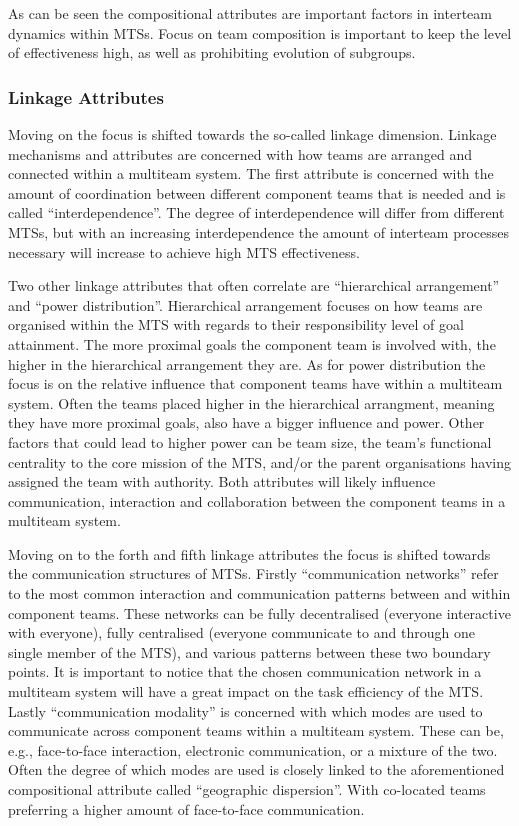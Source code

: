 As can be seen the compositional attributes are important factors in interteam dynamics within MTSs. Focus on team composition is important to keep the level of effectiveness high, as well as prohibiting evolution of subgroups.

\subsubsection{Linkage Attributes}

Moving on the focus is shifted towards the so-called linkage dimension. Linkage mechanisms and attributes are concerned with how teams are arranged and connected within a multiteam system. The first attribute is concerned with the amount of coordination between different component teams that is needed and is called ``interdependence''. The degree of interdependence will differ from different MTSs, but with an increasing interdependence the amount of interteam processes necessary will increase to achieve high MTS effectiveness.

Two other linkage attributes that often correlate are ``hierarchical arrangement'' and ``power distribution''. Hierarchical arrangement focuses on how teams are organised within the MTS with regards to their responsibility level of goal attainment. The more proximal goals the component team is involved with, the higher in the hierarchical arrangement they are. As for power distribution the focus is on the relative influence that component teams have within a multiteam system. Often the teams placed higher in the hierarchical arrangment, meaning they have more proximal goals, also have a bigger influence and power. Other factors that could lead to higher power can be team size, the team's functional centrality to the core mission of the MTS, and/or the parent organisations having assigned the team with authority. Both attributes will likely influence communication, interaction and collaboration between the component teams in a multiteam system.

Moving on to the forth and fifth linkage attributes the focus is shifted towards the communication structures of MTSs. Firstly ``communication networks'' refer to the most common interaction and communication patterns between and within component teams. These networks can be fully decentralised (everyone interactive with everyone), fully centralised (everyone communicate to and through one single member of the MTS), and various patterns between these two boundary points. It is important to notice that the chosen communication network in a multiteam system will have a great impact on the task efficiency of the MTS. Lastly ``communication modality'' is concerned with which modes are used to communicate across component teams within a multiteam system. These can be, e.g., face-to-face interaction, electronic communication, or a mixture of the two. Often the degree of which modes are used is closely linked to the aforementioned compositional attribute called ``geographic dispersion''. With co-located teams preferring a higher amount of face-to-face communication.


